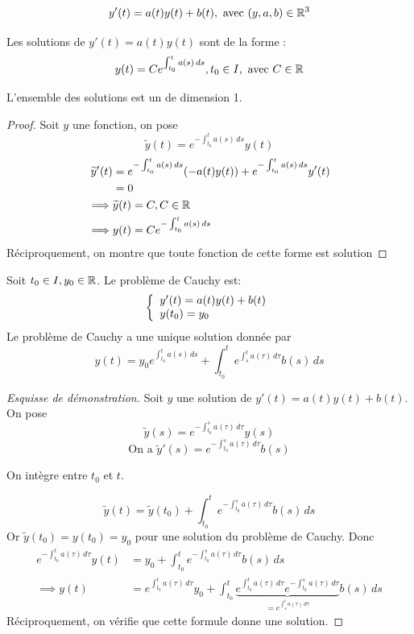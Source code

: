 \documentclass[]{report}
\begin{document}
\[y'(t)=a(t)y(t)+b(t),\text{ avec }(y,a,b)\in\mathbb{R}^3\]

\begin{tm}
    Les solutions de $y'(t)=a(t)y(t)$ sont de la forme :
    \[y(t)=Ce^{\int_{t_0}^t a(s)\,ds},t_0\in I,\text{ avec }C\in\mathbb{R}\]
    \begin{center}
        L'ensemble des solutions est un \ev de dimension 1.
    \end{center}
\end{tm}

\begin{proof}
    Soit $y$ une fonction, on pose 
    \[\widetilde{y}(t)=e^{-\int_{t_0}^t a(s)\,ds}y(t)\]
    \begin{align*}
        \widetilde{y}'(t)&=e^{-\int_{t_0}^t a(s)\,ds}(-a(t)y(t))+e^{-\int_{t_0}^t a(s)\,ds}y'(t)\\
        &= 0\\
        \implies& \widetilde{y}(t)=C,C\in\mathbb{R} \\
        \implies& y(t)=C e^{-\int_{t_0}^t a(s)\,ds}
    \end{align*}
    Réciproquement, on montre que toute fonction de cette forme est solution
\end{proof}

\begin{tm}
    Soit $t_0\in I, y_0\in \mathbb{R}$. Le problème de Cauchy est:
    \[\left\{\begin{array}{ll} y'(t)=a(t)y(t)+b(t)\\ y(t_0)=y_0 \end{array} \right.\]
    Le problème de Cauchy a une unique solution donnée par 
    \[y(t)=y_0 e^{\int_{t_0}^t a(s)\,ds}+\int_{t_0}^t e^{\int_{s}^t a(\tau)\,d\tau}b(s)\,ds\]
\end{tm}

\begin{proof}[Esquisse de démonstration]
    Soit $y$ une solution de $y'(t)=a(t)y(t)+b(t)$. On pose 
    \[\widetilde{y}(s)=e^{-\int_{t_0}^s a(\tau)\,d\tau}y(s)\]
    \[\text{On a }\widetilde{y}'(s)=e^{-\int_{t_0}^s a(\tau)\,d\tau}b(s)\]
    \begin{center}
        On intègre entre $t_0$ et $t$.
    \end{center}
    \[\widetilde{y}(t)=\widetilde{y}(t_0)+\int_{t_0}^t e^{-\int_{t_0}^s a(\tau)\,d\tau}b(s)\,ds\]
    Or $\widetilde{y}(t_0)=y(t_0)=y_0$ pour une solution du problème de Cauchy. Donc
    \begin{align*}
        e^{-\int_{t_0}^t a(\tau)\,d\tau}y(t)&=y_0+\int_{t_0}^t e^{-\int_{t_0}^s a(\tau)\,d\tau}b(s)\,ds\\
        \implies y(t)&=e^{\int_{t_0}^t a(\tau)\,d\tau}y_0+\int_{t_0}^t \underset{=e^{\int_s^t a(\tau)\,d\tau}}{\underbrace{e^{\int_{t_0}^ta(\tau)\,d\tau} e^{-\int_{t_0}^s a(\tau)\,d\tau}}} b(s)\,ds
    \end{align*}
    Réciproquement, on vérifie que cette formule donne une solution.
\end{proof}
\end{document}
